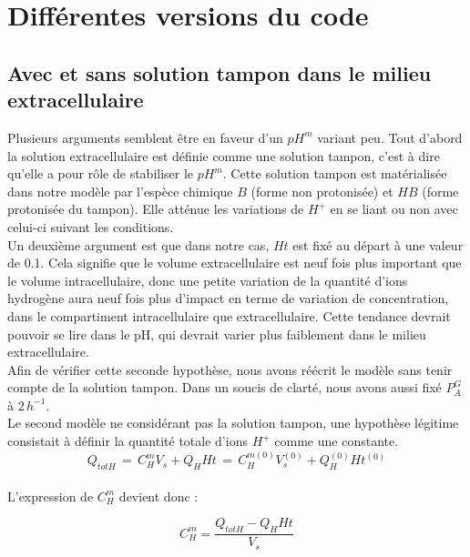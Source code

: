 \documentclass[a4paper,fleqn]{article}
\begin{document}
\section{Différentes versions du code}     

\subsection{Avec et sans solution tampon dans le milieu extracellulaire} 

Plusieurs arguments semblent être en faveur d'un $pH^m$ variant peu. Tout d'abord la solution extracellulaire est définie comme une solution tampon, c'est à dire qu'elle a pour rôle de stabiliser le $pH^m$. Cette solution tampon est matérialisée dans notre modèle par l'espèce chimique $B$ (forme non protonisée) et $HB$ (forme protonisée du tampon). Elle atténue les variations de $H^+$ en se liant ou non avec celui-ci suivant les conditions.\\

Un deuxième argument est que dans notre cas, $Ht$ est fixé au départ à une valeur de 0.1. Cela signifie que le volume extracellulaire est neuf fois plus important que le volume intracellulaire, donc une petite variation de la quantité d'ions hydrogène aura neuf fois plus d'impact en terme de variation de concentration, dans le compartiment intracellulaire que extracellulaire. Cette tendance devrait pouvoir se lire dans le pH, qui devrait varier plus faiblement dans le milieu extracellulaire.\\

Afin de vérifier cette seconde hypothèse, nous avons réécrit le modèle sans tenir compte de la solution tampon. Dans un soucis de clarté, nous avons aussi fixé $P_{A}^{G}$ à $2\,h^{-1}$.\\

Le second modèle ne considérant pas la solution tampon, une hypothèse légitime consistait à définir la quantité totale d'ions $H^+$ comme une constante. \\

\begin{equation}
Q_{tot H} \,= \,C^m_H V_s + Q_H Ht \,=\, C^{m(0)}_H V_s^{(0)} + Q_H^{(0)} Ht^{(0)}
\end{equation} \\

L'expression de $C^m_H$ devient donc :

\begin{equation}
C^m_H = \frac{Q_{tot H}-Q_H Ht}{V_s} 
\end{equation} 
\end{document}

